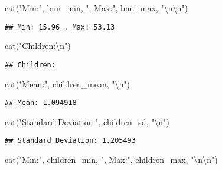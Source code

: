 \documentclass[
]{article}
\newenvironment{Shaded}{\begin{snugshade}}{\end{snugshade}}
\newcommand{\FunctionTok}[1]{\textcolor[rgb]{0.00,0.00,0.00}{#1}}
\newcommand{\NormalTok}[1]{#1}
\newcommand{\SpecialCharTok}[1]{\textcolor[rgb]{0.00,0.00,0.00}{#1}}
\newcommand{\StringTok}[1]{\textcolor[rgb]{0.31,0.60,0.02}{#1}}
\begin{document}
\begin{Shaded}
\begin{Highlighting}[]
\FunctionTok{cat}\NormalTok{(}\StringTok{"Min:"}\NormalTok{, bmi\_min, }\StringTok{", Max:"}\NormalTok{, bmi\_max, }\StringTok{"}\SpecialCharTok{\textbackslash{}n\textbackslash{}n}\StringTok{"}\NormalTok{)}
\end{Highlighting}
\end{Shaded}

\begin{verbatim}
## Min: 15.96 , Max: 53.13
\end{verbatim}

\begin{Shaded}
\begin{Highlighting}[]
\FunctionTok{cat}\NormalTok{(}\StringTok{"Children:}\SpecialCharTok{\textbackslash{}n}\StringTok{"}\NormalTok{)}
\end{Highlighting}
\end{Shaded}

\begin{verbatim}
## Children:
\end{verbatim}

\begin{Shaded}
\begin{Highlighting}[]
\FunctionTok{cat}\NormalTok{(}\StringTok{"Mean:"}\NormalTok{, children\_mean, }\StringTok{"}\SpecialCharTok{\textbackslash{}n}\StringTok{"}\NormalTok{)}
\end{Highlighting}
\end{Shaded}

\begin{verbatim}
## Mean: 1.094918
\end{verbatim}

\begin{Shaded}
\begin{Highlighting}[]
\FunctionTok{cat}\NormalTok{(}\StringTok{"Standard Deviation:"}\NormalTok{, children\_sd, }\StringTok{"}\SpecialCharTok{\textbackslash{}n}\StringTok{"}\NormalTok{)}
\end{Highlighting}
\end{Shaded}

\begin{verbatim}
## Standard Deviation: 1.205493
\end{verbatim}

\begin{Shaded}
\begin{Highlighting}[]
\FunctionTok{cat}\NormalTok{(}\StringTok{"Min:"}\NormalTok{, children\_min, }\StringTok{", Max:"}\NormalTok{, children\_max, }\StringTok{"}\SpecialCharTok{\textbackslash{}n\textbackslash{}n}\StringTok{"}\NormalTok{)}
\end{Highlighting}
\end{Shaded}
\end{document}
